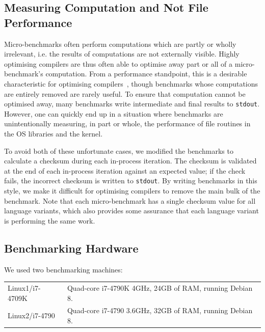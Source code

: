 \documentclass[a4paper,UKenglish]{lipics}
\newcommand{\bencherthree}{Linux1/i7-4709K\xspace}
\newcommand{\bencherfive}{Linux2/i7-4790\xspace}
\newcommand{\benchersix}{OpenBSD/i7-4790\xspace}
\begin{document}
\subsection{Measuring Computation and Not File Performance}

Micro-benchmarks often perform computations which are partly or wholly
irrelevant, i.e. the results of computations are not externally visible. Highly
optimising compilers are thus often able to optimise away part or all of a
micro-benchmark's computation. From a performance standpoint, this is a
desirable characteristic for
optimising compilers~\cite{seaton15phd}, though benchmarks whose computations
are entirely removed are rarely useful. To ensure that computation cannot
be optimised away, many benchmarks write intermediate and final results
to \texttt{stdout}. However, one can quickly end up in a situation where benchmarks are
unintentionally measuring, in part or whole, the performance of file routines in
the OS libraries and the kernel.

To avoid both of these unfortunate cases,
we modified the benchmarks to calculate a checksum during each in-process iteration.
The checksum is validated at the end of each in-process iteration against an expected
value; if the check fails, the incorrect checksum is written to \texttt{stdout}.
By writing benchmarks in
this style, we make it difficult for optimising compilers to remove the
main bulk of the benchmark. Note that each micro-benchmark has a single checksum value for all
language variants, which also provides some assurance that each language variant is
performing the same work.


\subsection{Benchmarking Hardware}

We used two benchmarking machines:

\begin{tabular}{ll}
  \bencherthree & Quad-core i7-4790K 4GHz, 24GB of RAM, running Debian 8. \\
  \bencherfive  & Quad-core i7-4790 3.6GHz, 32GB of RAM, running Debian 8.
\end{tabular}
\end{document}
